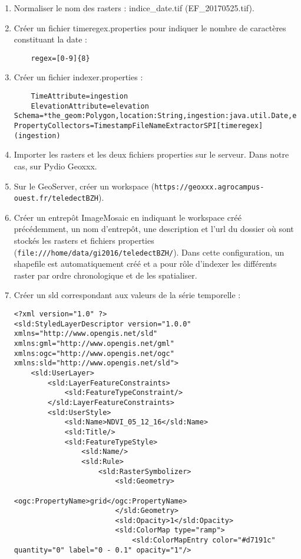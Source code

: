 \documentclass[10pt,a4paper]{article}
\begin{document}
\begin{enumerate}
\item Normaliser le nom des rasters : indice\_date.tif (EF\_20170525.tif).
\item Créer un fichier timeregex.properties pour indiquer le nombre de caractères constituant la date :
\begin{verbatim}
	regex=[0-9]{8}
\end{verbatim}
\item Créer un fichier indexer.properties :
\begin{verbatim}
	TimeAttribute=ingestion
	ElevationAttribute=elevation
Schema=*the_geom:Polygon,location:String,ingestion:java.util.Date,elevation:Integer
PropertyCollectors=TimestampFileNameExtractorSPI[timeregex](ingestion)
\end{verbatim}
\item Importer les rasters et les deux fichiers properties sur le serveur. Dans notre cas, sur Pydio Geoxxx.
\item Sur le GeoServer, créer un workspace (\verb!https://geoxxx.agrocampus-ouest.fr/teledectBZH!).
\item Créer un entrepôt ImageMosaic en indiquant le workspace créé précédemment, un nom d'entrepôt, une description et l'url du dossier où sont stockés les rasters et fichiers properties (\verb!file:///home/data/gi2016/teledectBZH/!). Dans cette configuration, un shapefile est automatiquement créé et a pour rôle d'indexer les différents raster par ordre chronologique et de les spatialiser.
\item Créer un sld correspondant aux valeurs de la série temporelle :
\begin{verbatim}
<?xml version="1.0" ?>
<sld:StyledLayerDescriptor version="1.0.0" xmlns="http://www.opengis.net/sld" xmlns:gml="http://www.opengis.net/gml" xmlns:ogc="http://www.opengis.net/ogc" xmlns:sld="http://www.opengis.net/sld">
    <sld:UserLayer>
        <sld:LayerFeatureConstraints>
            <sld:FeatureTypeConstraint/>
        </sld:LayerFeatureConstraints>
        <sld:UserStyle>
            <sld:Name>NDVI_05_12_16</sld:Name>
            <sld:Title/>
            <sld:FeatureTypeStyle>
                <sld:Name/>
                <sld:Rule>
                    <sld:RasterSymbolizer>
                        <sld:Geometry>
                            <ogc:PropertyName>grid</ogc:PropertyName>
                        </sld:Geometry>
                        <sld:Opacity>1</sld:Opacity>
                        <sld:ColorMap type="ramp">
                            <sld:ColorMapEntry color="#d7191c" quantity="0" label="0 - 0.1" opacity="1"/>

\end{verbatim}
\end{enumerate}
\end{document}
